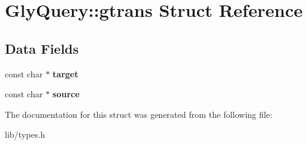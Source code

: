 \hypertarget{structGlyQuery_1_1gtrans}{
\section{GlyQuery::gtrans Struct Reference}
\label{structGlyQuery_1_1gtrans}
}
\subsection*{Data Fields}
\begin{DoxyCompactItemize}
\item 
\hypertarget{structGlyQuery_1_1gtrans_a8b73d66c948a8f8edddf8544652caa0a}{
const char $\ast$ {\bfseries target}}
\label{structGlyQuery_1_1gtrans_a8b73d66c948a8f8edddf8544652caa0a}

\item 
\hypertarget{structGlyQuery_1_1gtrans_a362de7ed88f3c97f4e3eac8a5dd6053b}{
const char $\ast$ {\bfseries source}}
\label{structGlyQuery_1_1gtrans_a362de7ed88f3c97f4e3eac8a5dd6053b}

\end{DoxyCompactItemize}


The documentation for this struct was generated from the following file:\begin{DoxyCompactItemize}
\item 
lib/types.h\end{DoxyCompactItemize}
